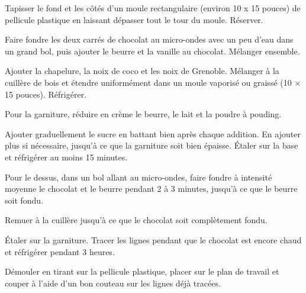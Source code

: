 \begin{steps}
    \item Tapisser le fond et les côtés d'un moule rectangulaire (environ 10 x 15 pouces) de pellicule plastique en laissant dépasser tout le tour du moule. Réserver.
    \item Faire fondre les deux carrés de chocolat au micro-ondes avec un peu d'eau dans un grand bol, puis ajouter le beurre et la vanille au chocolat. Mélanger ensemble.
    \item Ajouter la chapelure, la noix de coco et les noix de Grenoble. Mélanger à la cuillère de bois et étendre uniformément dans un moule vaporisé ou graissé (10 × 15 pouces). Réfrigérer.
    \item Pour la garniture, réduire en crème le beurre, le lait et la poudre à pouding.
    \item Ajouter graduellement le sucre en battant bien après chaque addition. En ajouter plus si nécessaire, jusqu'à ce que la garniture soit bien épaisse. Étaler sur la base et réfrigérer au moins 15 minutes.
    \item Pour le dessus, dans un bol allant au micro-ondes, faire fondre à intensité moyenne le chocolat et le beurre pendant 2 à 3 minutes, jusqu'à ce que le beurre soit fondu.
    \item Remuer à la cuillère jusqu'à ce que le chocolat soit complètement fondu.
    \item Étaler sur la garniture. Tracer les lignes pendant que le chocolat est encore chaud et réfrigérer pendant 3 heures.
    \item Démouler en tirant sur la pellicule plastique, placer sur le plan de travail et couper à l'aide d'un bon couteau sur les lignes déjà tracées.
\end{steps}
